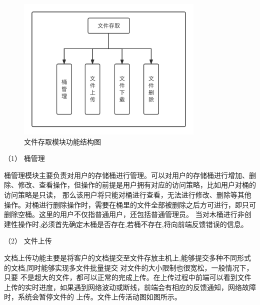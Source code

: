 \begin{figure}[htb]
    \centering
    \includegraphics[width=0.8\textwidth]{my_figures/chapter4/文件存取模块功能结构图.png}
    \caption{文件存取模块功能结构图}
    \label{fig:文件存取模块功能结构图}
\end{figure}

（1） 桶管理

桶管理模块主要负责对用户的存储桶进行管理。可以对用户的存储桶进行增加、删除、修改、查看操作，但操作的前提是用户拥有对应的访问策略，比如用户对桶的访问策略是只读，
那么该用户将只能对桶进行查看，无法进行修改、删除等其他操作。对桶进行删除操作时，需要在桶里的文件全部被删除之后方可进行，即只可删除空桶。这里的用户不仅指普通用户，还包括普通管理员。
当对木桶进行非创建性操作时,必须首先确定木桶是否存在,若桶不存在,将向前端反馈错误的信息。


（2） 文件上传

文档上传功能主要是将客户的文档提交至文件存放主机上,能够提交多种不同形式的文档,同时能够实现多文件批量提交
对文件的大小限制也很宽松，一般情况下，只要
不是超大的文件，都可以正常的完成上传。在上传过程中前端可以看到文件上传的实时进度，如果遇到网络波动或断线，前端会有相应的反馈通知，网络故障时，系统会暂停文件的
上传。文件上传活动图如图所示。

